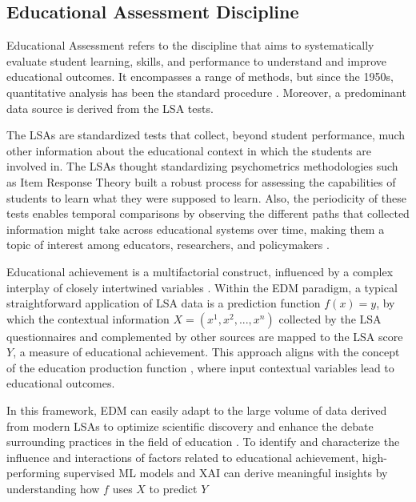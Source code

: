 \subsection{Educational Assessment Discipline}

Educational Assessment refers to the discipline that aims to systematically evaluate student learning, skills, and performance to understand and improve educational outcomes. It encompasses a range of methods, but since the 1950s, quantitative analysis has been the standard procedure \cite{noah1969towards}. Moreover, a predominant data source is derived from the \gls{LSA} tests. 

The \gls{LSA}s are standardized tests that collect, beyond student performance, much other information about the educational context in which the students are involved in. The \gls{LSA}s thought standardizing psychometrics methodologies such as Item Response Theory built a robust process for assessing the capabilities of students to learn what they were supposed to learn. Also, the periodicity of these tests enables temporal comparisons by observing the different paths that collected information might take across educational systems over time, making them a topic of interest among educators, researchers, and policymakers \cite{Johansson2016InternationalConsequences, Kaplan2021BayesianNAEP}.


Educational achievement is a multifactorial construct, influenced by a complex interplay of closely intertwined variables \cite{MartinezAbad2017Data-miningAchievement}. Within the \gls{EDM} paradigm, a typical straightforward application of \gls{LSA} data is a prediction function \(f(x) = y\), by which the contextual information \(X = (x^1, x^2, ..., x^n)\) collected by the \gls{LSA} questionnaires and complemented by other sources are mapped to the \gls{LSA} score \(Y\), a measure of educational achievement. This approach aligns with the concept of the education production function \cite{bowles1970towards, Scheerens1991ProcessEffectiveness}, where input contextual variables lead to educational outcomes.

In this framework, \gls{EDM} can easily adapt to the large volume of data derived from modern \gls{LSA}s to optimize scientific discovery and enhance the debate surrounding practices in the field of education \cite{Gabriel2018ALiteracy, Gomes2020StudentBrazil,Martinez-Abad2020EducationalAssessment, Lezhnina2022CombiningPISA, Martinez-Abad2018BigEducation}. To identify and characterize the influence and interactions of factors related to educational achievement, high-performing supervised \gls{ML} models and \gls{XAI} can derive meaningful insights by understanding how \(f\) uses \(X\) to predict \(Y\) \cite{Chen2021SynergisticLiteracy, Dong2019AnApproaches, Gorostiaga2016OnSpain, Hu2022DiscoveryApproach, Martinez-Abad2020EducationalAssessment} 

